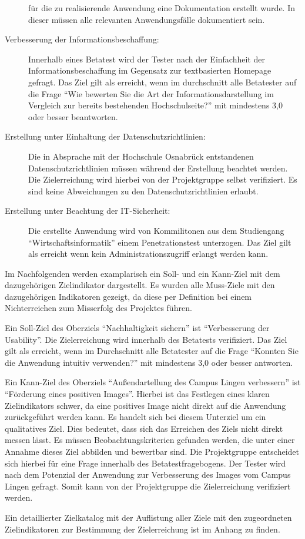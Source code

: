 \begin{description}
	für die zu realisierende Anwendung eine Dokumentation erstellt wurde. In dieser
	müssen alle relevanten Anwendungsfälle dokumentiert sein.
	\item[Verbesserung der Informationsbeschaffung:] Innerhalb eines Betatest wird
	der Tester nach der Einfachheit der Informationsbeschaffung im
	Gegensatz zur textbasierten Homepage gefragt. Das Ziel gilt als erreicht, wenn
	im durchschnitt alle Betatester auf die Frage "`Wie bewerten Sie die Art der
	Informationsdarstellung im Vergleich zur bereits bestehenden Hochschulseite?"'
	mit mindestens 3,0 oder besser beantworten.
	\item[Erstellung unter Einhaltung der Datenschutzrichtlinien:] Die in Absprache
	mit der Hochschule Osnabrück entstandenen Datenschutzrichtlinien müssen während
	der Erstellung beachtet werden. Die Zielerreichung wird hierbei von der
	Projektgruppe selbst verifiziert. Es sind keine Abweichungen zu den
	Datenschutzrichtlinien erlaubt.
	\item[Erstellung unter Beachtung der IT-Sicherheit:] Die erstellte Anwendung
	wird von Kommilitonen aus dem Studiengang "`Wirtschaftsinformatik"' einem
	Penetrationstest unterzogen. Das Ziel gilt als erreicht wenn kein
	Administrationszugriff erlangt werden kann. 
\end{description}

Im Nachfolgenden werden examplarisch ein Soll- und ein Kann-Ziel mit dem
dazugehörigen Zielindikator dargestellt. Es wurden alle Muss-Ziele mit den
dazugehörigen Indikatoren gezeigt, da diese per Definition bei einem
Nichterreichen zum Misserfolg des Projektes führen.

Ein Soll-Ziel des Oberziels "`Nachhaltigkeit sichern"' ist "`Verbesserung der
Usability"'. Die Zielerreichung wird innerhalb des Betatests verifiziert. Das
Ziel gilt als erreicht, wenn im Durchschnitt alle Betatester auf die Frage
"`Konnten Sie die Anwendung intuitiv verwenden?"' mit mindestens 3,0 oder besser
antworten. %

Ein Kann-Ziel des Oberziels "`Außendartellung des Campus Lingen
verbessern"' ist "`Förderung eines positiven Images"'. Hierbei ist das Festlegen
eines klaren Zielindikators schwer, da eine positives Image nicht direkt auf die
Anwendung zurückgeführt werden kann. Es handelt sich bei diesem Unterziel um ein
qualitatives Ziel. %
Dies bedeutet, dass sich das Erreichen des Ziels nicht direkt messen lässt. Es
müssen Beobachtungskriterien gefunden werden, die unter einer Annahme dieses
Ziel abbilden und bewertbar sind. Die Projektgruppe entscheidet sich hierbei für
eine Frage innerhalb des Betatestfragebogens. Der Tester wird nach dem
Potenzial der Anwendung zur Verbesserung des Images vom Campus Lingen gefragt.
Somit kann von der Projektgruppe die Zielerreichung verifiziert werden.

Ein detaillierter Zielkatalog mit der Auflistung aller Ziele mit den
zugeordneten Zielindikatoren zur Bestimmung der Zielerreichung ist im Anhang
zu finden.











